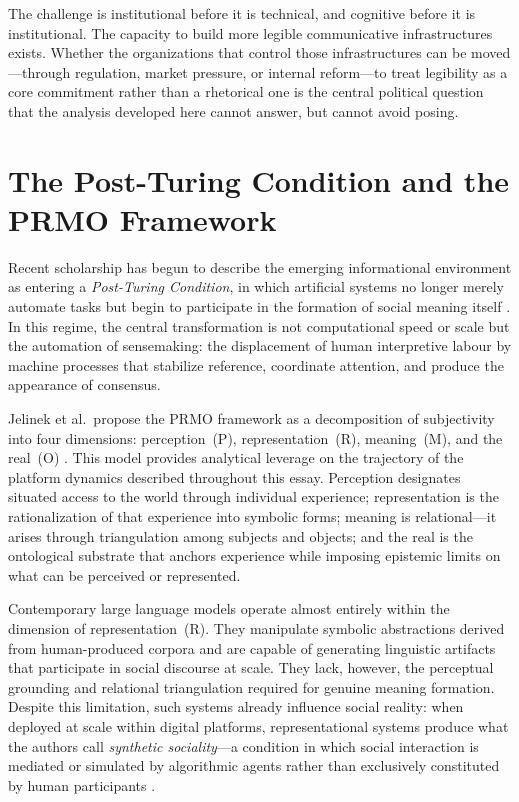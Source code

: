 \documentclass[12pt,a4paper]{article}
\begin{document}
The challenge is institutional before it is technical, and cognitive before it is institutional.
The capacity to build more legible communicative infrastructures exists. Whether the
organizations that control those infrastructures can be moved---through regulation, market
pressure, or internal reform---to treat legibility as a core commitment rather than a rhetorical
one is the central political question that the analysis developed here cannot answer, but cannot
avoid posing.

\section{The Post-Turing Condition and the PRMO Framework}

Recent scholarship has begun to describe the emerging informational environment as entering
a \emph{Post-Turing Condition}, in which artificial systems no longer merely automate tasks
but begin to participate in the formation of social meaning itself \citep{jelinek2026}. In
this regime, the central transformation is not computational speed or scale but the automation
of sensemaking: the displacement of human interpretive labour by machine processes that
stabilize reference, coordinate attention, and produce the appearance of consensus.

Jelinek et al.\ propose the PRMO framework as a decomposition of subjectivity into four
dimensions: perception~(P), representation~(R), meaning~(M), and the real~(O)
\citep{jelinek2026}. This model provides analytical leverage on the trajectory of the platform
dynamics described throughout this essay. Perception designates situated access to the world
through individual experience; representation is the rationalization of that experience into
symbolic forms; meaning is relational---it arises through triangulation among subjects and
objects; and the real is the ontological substrate that anchors experience while imposing
epistemic limits on what can be perceived or represented.

Contemporary large language models operate almost entirely within the dimension of
representation~(R). They manipulate symbolic abstractions derived from human-produced corpora
and are capable of generating linguistic artifacts that participate in social discourse at
scale. They lack, however, the perceptual grounding and relational triangulation required for
genuine meaning formation. Despite this limitation, such systems already influence social
reality: when deployed at scale within digital platforms, representational systems produce what
the authors call \emph{synthetic sociality}---a condition in which social interaction is
mediated or simulated by algorithmic agents rather than exclusively constituted by human
participants \citep{jelinek2026}.
\end{document}
